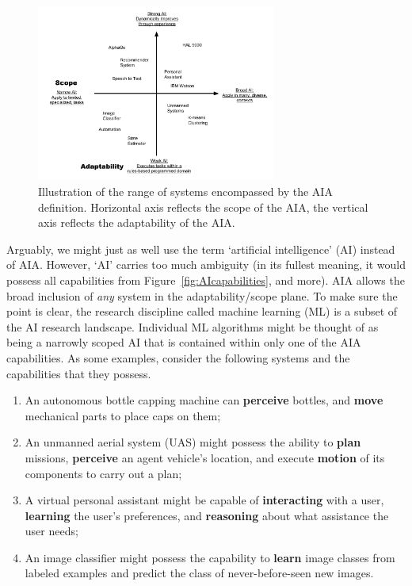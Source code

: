 	\begin{figure}[htbp]
    	\centering
     	\includegraphics[width=0.7\textwidth]{Figures/strong_weak_narrow_broad.pdf}
    	\caption{Illustration of the range of systems encompassed by the AIA definition. Horizontal axis reflects the scope of the AIA, the vertical axis reflects the adaptability of the AIA.}
        \label{fig:StrongWeak}
    \end{figure}

  Arguably, we might just as well use the term `artificial intelligence' (AI) instead of AIA. However, `AI' carries too much ambiguity (in its fullest meaning, it would possess all capabilities from Figure~\ref{fig:AIcapabilities}, and more). AIA allows the broad inclusion of \emph{any} system in the adaptability/scope plane. %
To make sure the point is clear, the research discipline called machine learning (ML) is a subset of the AI research landscape. Individual ML algorithms might be thought of as being a narrowly scoped AI that is contained within only one of the AIA capabilities. As some examples, consider the following systems and the capabilities that they possess.

    \begin{enumerate}
         \item An autonomous bottle capping machine can \textbf{perceive} bottles, and \textbf{move} mechanical parts to place caps on them;
         \item An unmanned aerial system (UAS) might possess the ability to \textbf{plan} missions, \textbf{perceive} an agent vehicle's location, and execute \textbf{motion} of its components to carry out a plan; 
         \item A virtual personal assistant might be capable of \textbf{interacting} with a user, \textbf{learning} the user's preferences, and \textbf{reasoning} about what assistance the user needs;
         \item An image classifier might possess the capability to \textbf{learn} image classes from labeled examples and predict the class of never-before-seen new images.
     \end{enumerate}


